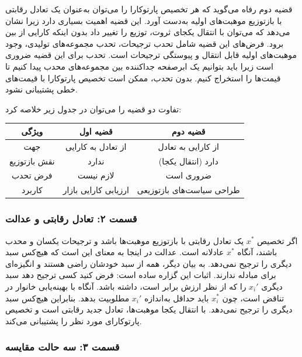 \documentclass[12pt,a4paper]{article}
\begin{document}
قضیه دوم رفاه می‌گوید که هر تخصیص پارتوکارا را می‌توان به‌عنوان یک تعادل رقابتی با بازتوزیع موهبت‌های اولیه به‌دست آورد. این قضیه اهمیت بسیاری دارد زیرا نشان می‌دهد که می‌توان با انتقال یکجای ثروت، توزیع را تغییر داد بدون اینکه کارایی از بین برود. فرض‌های این قضیه شامل تحدب ترجیحات، تحدب مجموعه‌های تولیدی، وجود موهبت‌های اولیه قابل انتقال و پیوستگی ترجیحات است. تحدب برای این قضیه ضروری است زیرا باید بتوانیم یک ابرصفحه جداکننده بین مجموعه‌های محدب پیدا کنیم تا قیمت‌ها را استخراج کنیم. بدون تحدب، ممکن است تخصیص پارتوکارا با قیمت‌های خطی پشتیبانی نشود.

تفاوت دو قضیه را می‌توان در جدول زیر خلاصه کرد:

\begin{center}
	\begin{tabular}{|c|c|c|}
		\hline
		\textbf{ویژگی} & \textbf{قضیه اول}    & \textbf{قضیه دوم}        \\
		\hline
		جهت            & از تعادل به کارایی   & از کارایی به تعادل       \\
		\hline
		نقش بازتوزیع   & ندارد                & دارد (انتقال یکجا)       \\
		\hline
		فرض تحدب       & لازم نیست            & ضروری است                \\
		\hline
		کاربرد         & ارزیابی کارایی بازار & طراحی سیاست‌های بازتوزیعی \\
		\hline
	\end{tabular}
\end{center}

\subsubsection*{قسمت ۲: تعادل رقابتی و عدالت}

اگر تخصیص $x^*$ یک تعادل رقابتی با بازتوزیع موهبت‌ها باشد و ترجیحات یکسان و محدب باشند، آنگاه $x^*$ عادلانه است. عدالت در اینجا به معنای این است که هیچ‌کس سبد دیگری را ترجیح نمی‌دهد. به بیان دیگر، همه از سبد خودشان راضی هستند و انگیزه‌ای برای مبادله ندارند. اثبات این گزاره ساده است: فرض کنید کسی ترجیح دهد سبد دیگری $x_i'$ را که از نظر ارزش برابر است، داشته باشد. آنگاه با بهینه‌یابی خانوار در تناقض است، چون $x_i^*$ باید حداقل به‌اندازه $x_i'$ مطلوبیت بدهد. بنابراین هیچ‌کس سبد دیگری را ترجیح نمی‌دهد. با انتقال یکجا موهبت‌ها، تعادل جدید رقابتی است و تخصیص پارتوکارای مورد نظر را پشتیبانی می‌کند.

\subsubsection*{قسمت ۳: سه حالت مقایسه}
\end{document}
